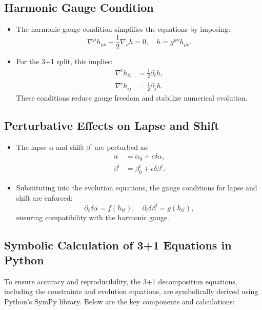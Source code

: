 \documentclass[12pt]{article}
\begin{document}
\subsection{Harmonic Gauge Condition}
\begin{itemize}
    \item The harmonic gauge condition simplifies the equations by imposing:
    \[
    \nabla^\mu h_{\mu\nu} - \frac{1}{2} \nabla_\nu h = 0, \quad h = g^{\mu\nu} h_{\mu\nu}.
    \]
    \item For the 3+1 split, this implies:
    \begin{align*}
        \nabla^i h_{it} &= \frac{1}{2} \partial_t h, \\
        \nabla^i h_{ij} &= \frac{1}{2} \partial_j h.
    \end{align*}
    These conditions reduce gauge freedom and stabilize numerical evolution.
\end{itemize}

\subsection{Perturbative Effects on Lapse and Shift}
\begin{itemize}
    \item The lapse $\alpha$ and shift $\beta^i$ are perturbed as:
    \begin{align*}
        \alpha &= \alpha_0 + \epsilon \delta\alpha, \\
        \beta^i &= \beta_0^i + \epsilon \delta\beta^i.
    \end{align*}
    \item Substituting into the evolution equations, the gauge conditions for lapse and shift are enforced:
    \[
    \partial_t \delta\alpha = f(h_{tt}), \quad \partial_t \delta\beta^i = g(h_{ti}),
    \]
    ensuring compatibility with the harmonic gauge.
\end{itemize}

\subsection{Symbolic Calculation of 3+1 Equations in Python}

To ensure accuracy and reproducibility, the 3+1 decomposition equations, including the constraints and evolution equations, are symbolically derived using Python's SymPy library. Below are the key components and calculations:
\end{document}
